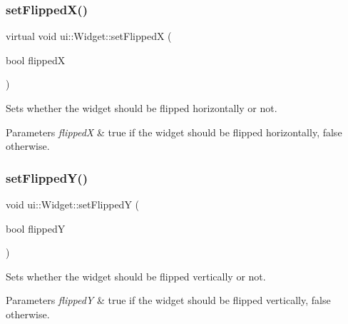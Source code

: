 \subsubsection{\texorpdfstring{set\+Flipped\+X()}{setFlippedX()}\hspace{0.1cm}{\footnotesize\ttfamily [2/2]}}
{\footnotesize\ttfamily virtual void ui\+::\+Widget\+::set\+FlippedX (\begin{DoxyParamCaption}\item[{bool}]{flippedX }\end{DoxyParamCaption})\hspace{0.3cm}{\ttfamily [virtual]}}

Sets whether the widget should be flipped horizontally or not.


\begin{DoxyParams}{Parameters}
{\em flippedX} & true if the widget should be flipped horizontally, false otherwise. \\
\hline
\end{DoxyParams}
\mbox{\label{classui_1_1Widget_add1302904325f3784a02d29e29f83c94}} 
\subsubsection{\texorpdfstring{set\+Flipped\+Y()}{setFlippedY()}\hspace{0.1cm}{\footnotesize\ttfamily [1/2]}}
{\footnotesize\ttfamily void ui\+::\+Widget\+::set\+FlippedY (\begin{DoxyParamCaption}\item[{bool}]{flippedY }\end{DoxyParamCaption})\hspace{0.3cm}{\ttfamily [virtual]}}

Sets whether the widget should be flipped vertically or not.


\begin{DoxyParams}{Parameters}
{\em flippedY} & true if the widget should be flipped vertically, false otherwise. \\
\hline
\end{DoxyParams}
\mbox{\label{classui_1_1Widget_a4abd5fb73abbe7ba407f6fbb41e4ac4e}} 
